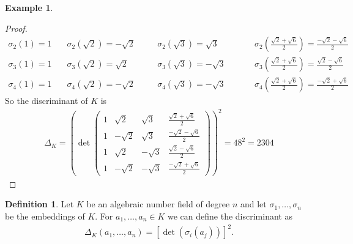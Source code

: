 \documentclass[a4paper]{book}
\theoremstyle{definition}
\newtheorem{definition}{Definition}[]
\newtheorem{example}{Example}[definition]
\begin{document}
\begin{example}
\begin{enumerate}
\begin{proof}
\begin{alignat*}
            \sigma_2(1) = 1 & \quad \sigma_2(\sqrt{2}) = -\sqrt{2} && \quad \sigma_2(\sqrt{3}) = \sqrt{3} &&& \quad \sigma_2 \left(\frac{\sqrt{2} + \sqrt{6}}{2}\right) = \frac{-\sqrt{2} - \sqrt{6}}{2} \\
            \sigma_3(1) = 1 & \quad \sigma_3(\sqrt{2}) = \sqrt{2} && \quad \sigma_3(\sqrt{3}) = - \sqrt{3} &&& \quad \sigma_3 \left(\frac{\sqrt{2} + \sqrt{6}}{2}\right) = \frac{\sqrt{2} - \sqrt{6}}{2} \\
            \sigma_4(1) = 1 & \quad \sigma_4(\sqrt{2}) = -\sqrt{2} && \quad \sigma_4(\sqrt{3}) = - \sqrt{3} &&& \quad \sigma_4 \left(\frac{\sqrt{2} + \sqrt{6}}{2}\right) = \frac{-\sqrt{2} + \sqrt{6}}{2}
        \end{alignat*}
        So the discriminant of \(K\) is
        \begin{align*}
            \Delta_K = \left(\det \begin{pmatrix}
                1 & \sqrt{2} & \sqrt{3} & \frac{\sqrt{2} + \sqrt{6}}{2} \\
                1 & -\sqrt{2} & \sqrt{3} & \frac{-\sqrt{2} - \sqrt{6}}{2} \\
                1 & \sqrt{2} & -\sqrt{3} & \frac{\sqrt{2} - \sqrt{6}}{2} \\
                1 & -\sqrt{2} & -\sqrt{3} & \frac{-\sqrt{2} + \sqrt{6}}{2}
            \end{pmatrix}\right)^2
            = 48^2 = 2304
        \end{align*}
    \end{proof}
    \end{enumerate}
\end{example}

\begin{defbox}
    \begin{definition}
        Let \(K\) be an algebraic number field of degree \(n\) and let \(\sigma_1, \ldots, \sigma_n\) be the embeddings of \(K\). For \(a_1, \ldots, a_n \in K\) we can define the discriminant as
        \begin{align*}
            \Delta_K (a_1, \ldots, a_n) = [\det(\sigma_i(a_j))]^2 \text{.}
        \end{align*}
    \end{definition}
\end{defbox}
\end{document}

